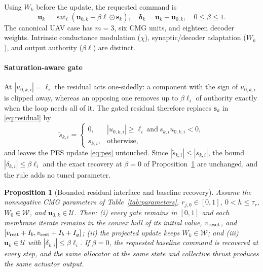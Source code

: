 \documentclass[letterpaper, 10 pt, conference]{ieeeconf}
\newcommand{\sat}{\operatorname{sat}}
\newtheorem{proposition}{Proposition}
\begin{document}
Using $W_k$ before the update, the requested command is
\begin{equation}
 \bm u_k=\sat_{\bm\ell}(\bm u_{0,k}+\beta\bm\ell\odot\bm s_k),\quad
 \bm\delta_k=\bm u_k-\bm u_{0,k},\quad 0\le\beta\le1.
 \label{eq:residual}
\end{equation}
The canonical UAV case has $m=3$, six CMG units, and eighteen decoder
weights. Intrinsic conductance modulation ($\chi$), synaptic/decoder adaptation ($W_k$), and output authority ($\beta\bm\ell$) are distinct.

\paragraph{Saturation-aware gate}
At $|u_{0,k,i}|=\ell_i$ the residual acts one-sidedly: a component with the sign of $u_{0,k,i}$ is clipped away, whereas an opposing one removes up to $\beta\ell_i$ of authority exactly when the loop needs all of it. The gated residual therefore replaces $\bm s_k$ in \eqref{eq:residual} by
\begin{equation}
 \tilde s_{k,i}=\begin{cases}0,&|u_{0,k,i}|\ge\ell_i\ \text{and}\ s_{k,i}u_{0,k,i}<0,\\ s_{k,i},&\text{otherwise,}\end{cases}
 \label{eq:gate}
\end{equation}
and leaves the PES update \eqref{eq:pes} untouched. Since $|\tilde s_{k,i}|\le|s_{k,i}|$, the bound $|\delta_{k,i}|\le\beta\ell_i$ and the exact recovery at $\beta=0$ of Proposition~\ref{prop:bounded} are unchanged, and the rule adds no tuned parameter.

\begin{proposition}[Bounded residual interface and baseline recovery]\label{prop:bounded}
Assume the nonnegative CMG parameters of Table~\ref{tab:parameters}, $r_{j,0}\in[0,1]$, $0<h\le\tau_r$, $W_0\in\mathcal W$, and $\bm u_{0,k}\in\mathcal U$. Then: (i) every gate remains in $[0,1]$ and each membrane iterate remains in the convex hull of its initial value, $v_{\rm reset}$, and $[v_{\rm rest}+I_b,v_{\rm rest}+I_b+I_g]$; (ii) the projected update keeps $W_k\in\mathcal W$; and (iii) $\bm u_k\in\mathcal U$ with $|\delta_{k,i}|\le\beta\ell_i$. If $\beta=0$, the requested baseline command is recovered at every step, and the same allocator at the same state and collective thrust produces the same actuator output.
\end{proposition}

\end{document}
